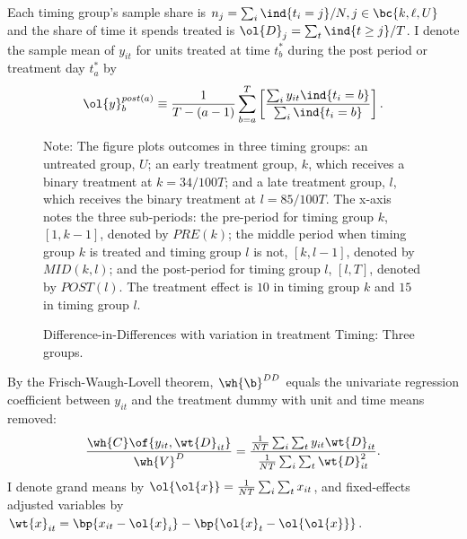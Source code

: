\documentclass[12pt]{article}
\theoremstyle{definition}
\begin{document}
Each timing group's sample share is $n_j = \sum_i \ind{t_i = j} / N, j \in \bc{k, \ell, U}$ and the share of time it spends treated is $\ol{D}_j = \sum_t \ind{t \geq j} / T$. I denote the sample mean of $y_{it}$ for units treated at time $t_b^*$ during the post period or treatment day $t_a^*$ by 
$$
\ol{y}_b^{post(a)} \equiv \frac{1}{T-(a-1)} \sum_{b = a}^{T}\left[\frac{\sum_i y_{i t} \ind{t_i=b}}{\sum_i \ind{t_i=b}}\right] .
$$

\begin{figure}[H]
    \noindent\caption{Difference-in-Differences with variation in treatment Timing: Three groups.}
    \begin{center}
    \end{center}
    \medskip
    {\footnotesize Note: The figure plots outcomes in three timing groups: an untreated group, $U$; an early treatment group, $k$, which receives a binary treatment at $k = 34/100 T$; and a late treatment group, $l$, which receives the binary treatment at $l = 85/100 T$. The x-axis notes the three sub-periods: the pre-period for timing group $k$, $[1, k - 1]$, denoted by $PRE(k)$; the middle  period when timing group $k$ is treated and timing group $l$ is not, $[k, l - 1]$, denoted by $MID(k, l)$; and the post-period for timing group $l$, $[l, T]$, denoted by $POST(l)$. The treatment effect is $10$ in timing group $k$ and $15$ in timing group $l$.}
    \label{goodman-baconDifferenceinDifferencesVariationTreatment2021_fig1}
\end{figure}

By the Frisch-Waugh-Lovell theorem, $\wh{\b}^{DD}$ equals the univariate regression coefficient between $y_{it}$ and the treatment dummy with unit and time means removed:
\begin{equation}
    \label{3}
    \frac{\wh{C}\of{y_{it}, \wt{D}_{it}}}{\wh{V}^D} =\frac{\frac{1}{NT} \sum_i \sum_t y_{it} \wt{D}_{it}}{\frac{1}{NT} \sum_i \sum_t \wt{D}_{it}^2}.
\end{equation}
I denote grand means by $\ol{\ol{x}} = \frac{1}{NT} \sum_i \sum_t x_{it}$, and fixed-effects adjusted variables by $\wt{x}_{it} = \bp{x_{it} - \ol{x}_i} - \bp{\ol{x}_t - \ol{\ol{x}}}$.
\end{document}
